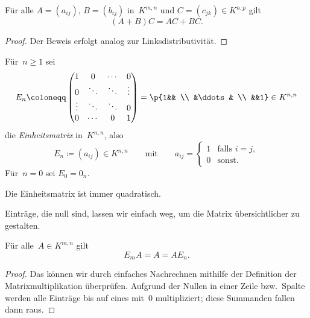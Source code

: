 \documentclass[a4paper]{article}
\begin{document}
\begin{lemma}[Rechtsdistributitvität]\label{lem:matrix:dr}
    Für alle $A = (a_{ij})$, $B = (b_{ij})$ in~$K^{m,n}$ und $C = (c_{jk}) \in K^{n,p}$ gilt
    \begin{equation*}
        (A+B)C = AC+BC.
    \end{equation*}
\end{lemma}

\begin{proof}
    Der Beweis erfolgt analog zur Linksdistributivität.
\end{proof}

\begin{definition}[Einheitsmatrix]
    Für~$n \geq 1$ sei
    \begin{equation*}
        E_n \coloneqq \begin{pmatrix}
            1 & 0 & \cdots & 0 \\
            0 & \ddots & \ddots & \vdots \\
            \vdots & \ddots & \ddots & 0 \\
            0 & \cdots & 0 & 1
        \end{pmatrix}
        = \p{1&& \\ &\ddots& \\ &&1} \in K^{n,n}
    \end{equation*}
    die \emph{Einheitsmatrix} in~$K^{n,n}$, also
    \begin{equation*}
        E_n \coloneqq (a_{ij}) \in K^{n,n} \qquad\text{mit}\qquad a_{ij} =
        \begin{cases}
            1 & \text{falls } i = j, \\
            0 & \text{sonst}.
        \end{cases}
    \end{equation*}
    Für~$n = 0$ sei $E_0 = 0_n$.
\end{definition}

Die Einheitsmatrix ist immer quadratisch.

Einträge, die null sind, lassen wir einfach weg, um die Matrix übersichtlicher zu gestalten. 

\begin{lemma}[Einselement]\label{lem:matrix:mn}
    Für alle~$A \in K^{m,n}$ gilt
    \begin{equation*}
        E_mA = A = AE_n.
    \end{equation*}
\end{lemma}

\begin{proof}
    Das können wir durch einfaches Nachrechnen mithilfe der Definition der Matrixmultiplikation überprüfen. Aufgrund der Nullen in einer Zeile bzw.\ Spalte werden alle Einträge bis auf eines mit~$0$ multipliziert; diese Summanden fallen dann raus.
\end{proof}
\end{document}
